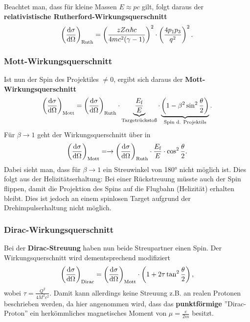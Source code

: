 Beachtet man, dass für kleine Massen $E\approx pc$ gilt, folgt daraus der \textbf{relativistische Rutherford-Wirkungsquerschnitt}
\begin{equation*}
	\left(\diff[\sigma]{\Omega}\right)_\text{Ruth} = \left(\frac{zZ\alpha\hbar c}{4mc^2(\gamma-1)}\right)^2\cdot\left(\frac{4p_1p_3}{q^2}\right)^2.
\end{equation*}

\subsubsection{Mott-Wirkungsquerschnitt}
Ist nun der Spin des Projektiles $\neq 0$, ergibt sich daraus der \textbf{Mott-Wirkungsquerschnitt}
\begin{equation*}
	\left(\diff[\sigma]{\Omega}\right)_\text{Mott} = \left(\diff[\sigma]{\Omega}\right)_\text{Ruth}\cdot\underbrace{\frac{E_\text{f}}{E}}_\text{Targetrückstoß}\cdot\underbrace{\left(1-\beta^2\sin^2\frac{\theta}{2}\right)}_\text{Spin d. Projektils}.
\end{equation*}
Für $\beta\rightarrow 1$ geht der Wirkungsquerschnitt über in
\begin{equation*}
	\left(\diff[\sigma]{\Omega}\right)_\text{Mott}= \rightarrow\left(\diff[\sigma]{\Omega}\right)_\text{Ruth}\cdot\frac{E_\text{f}}{E}\cdot\cos^2\frac{\theta}{2}.
\end{equation*}
Dabei sieht man, dass für $\beta\rightarrow 1$ ein Streuwinkel von 180° nicht möglich ist.
Dies folgt aus der Helizitätserhaltung: Bei einer Rückstreuung müsste auch der Spin flippen, damit die Projektion des Spins auf die Flugbahn (Helizität) erhalten bleibt. Dies ist jedoch an einem spinlosen Target aufgrund der Drehimpulserhaltung nicht möglich.

\subsubsection{Dirac-Wirkungsquerschnitt}
Bei der \textbf{Dirac-Streuung} haben nun beide Streupartner einen Spin.
Der Wirkungsquerschnitt wird dementsprechend modifiziert
\begin{equation*}
	\left(\diff[\sigma]{\Omega}\right)_\text{Dirac} = \left(\diff[\sigma]{\Omega}\right)_\text{Mott}\cdot\left(1+2\tau\tan^2\frac{\theta}{2}\right),
\end{equation*}
wobei $\tau = \frac{Q^2}{4M^2c^2}$.
Damit kann allerdings keine Streuung z.B. an realen Protonen beschrieben werden, da hier angenommen wird, dass das \textbf{punktförmige} ''Dirac-Proton'' ein herkömmliches magnetisches Moment von $\mu=\frac{e}{2m}$ besitzt.
